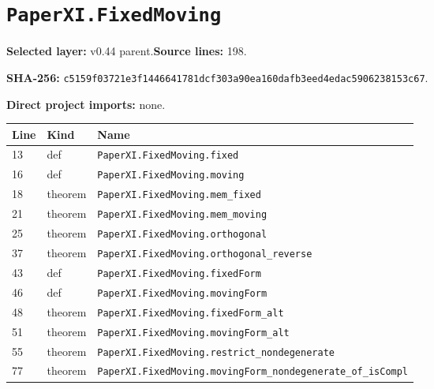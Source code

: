 \documentclass[10pt,oneside]{book}
\begin{document}
\section{\texorpdfstring{\nolinkurl{PaperXI.FixedMoving}}{PaperXI.FixedMoving}}\label{module:PaperXI.FixedMoving}

\textbf{Selected layer:} v0.44 parent.\quad\textbf{Source lines:} 198.\par\textbf{SHA-256:} {\scriptsize\nolinkurl{c5159f03721e3f1446641781dcf303a90ea160dafb3eed4edac5906238153c67}}.


\textbf{Direct project imports:} none.

\begin{longtable}{@{}p{}p{}p{}@{}}\toprule Line&Kind&Name\\\midrule\endhead

13&def&\nolinkurl{PaperXI.FixedMoving.fixed}\\

16&def&\nolinkurl{PaperXI.FixedMoving.moving}\\

18&theorem&\nolinkurl{PaperXI.FixedMoving.mem_fixed}\\

21&theorem&\nolinkurl{PaperXI.FixedMoving.mem_moving}\\

25&theorem&\nolinkurl{PaperXI.FixedMoving.orthogonal}\\

37&theorem&\nolinkurl{PaperXI.FixedMoving.orthogonal_reverse}\\

43&def&\nolinkurl{PaperXI.FixedMoving.fixedForm}\\

46&def&\nolinkurl{PaperXI.FixedMoving.movingForm}\\

48&theorem&\nolinkurl{PaperXI.FixedMoving.fixedForm_alt}\\

51&theorem&\nolinkurl{PaperXI.FixedMoving.movingForm_alt}\\

55&theorem&\nolinkurl{PaperXI.FixedMoving.restrict_nondegenerate}\\

77&theorem&\nolinkurl{PaperXI.FixedMoving.movingForm_nondegenerate_of_isCompl}\\


\end{longtable}
\end{document}
